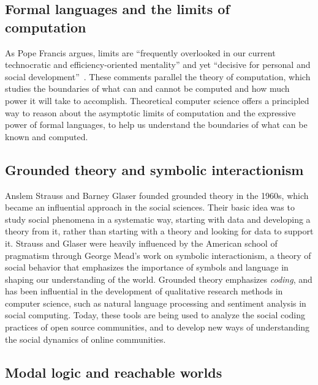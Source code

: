 \documentclass[sigplan,nonacm]{acmart}\settopmatter{printfolios=false,printccs=false,printacmref=false}
\begin{document}
  \subsection{Formal languages and the limits of computation}

  As Pope Francis argues, limits are ``frequently overlooked in our current technocratic and efficiency-oriented mentality'' and yet ``decisive for personal and social development''~\cite{catholic2024message}. These comments parallel the theory of computation, which studies the boundaries of what can and cannot be computed and how much power it will take to accomplish. Theoretical computer science offers a principled way to reason about the asymptotic limits of computation and the expressive power of formal languages, to help us understand the boundaries of what can be known and computed.


  \subsection{Grounded theory and symbolic interactionism}

  Anslem Strauss and Barney Glaser founded grounded theory in the 1960s, which became an influential approach in the social sciences. Their basic idea was to study social phenomena in a systematic way, starting with data and developing a theory from it, rather than starting with a theory and looking for data to support it. Strauss and Glaser were heavily influenced by the American school of pragmatism through George Mead's work on symbolic interactionism, a theory of social behavior that emphasizes the importance of symbols and language in shaping our understanding of the world. Grounded theory emphasizes \textit{coding}, and has been influential in the development of qualitative research methods in computer science, such as natural language processing and sentiment analysis in social computing. Today, these tools are being used to analyze the social coding practices of open source communities, and to develop new ways of understanding the social dynamics of online communities.

  \subsection{Modal logic and reachable worlds}
\end{document}
